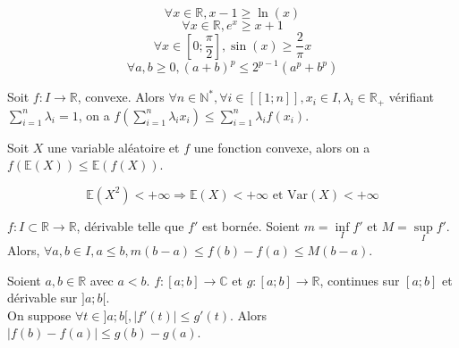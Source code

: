 \documentclass[landscape,twocolumn]{article}
\begin{document}
\begin{exe}
$$\forall x \in \mathbb{R}, x-1 \geqslant \ln(x)$$
$$\forall x \in \mathbb{R}, e^x \geqslant x+1$$
$$\forall x \in [0;\dfrac{\pi}{2}], \sin(x) \geqslant \dfrac{2}{\pi}x$$
$$ \forall a,b \geq 0 , (a+b)^p \leq 2^{p-1} (a^p+b^p)$$

\end{exe}

\begin{ine}
\begin{center}
Soit $f : I \longrightarrow \mathbb{R}$, convexe. Alors $\forall n \in \mathbb{N}^*,\forall i \in [\![1;n]\!], x_i \in I, \lambda_i \in \mathbb{R}_+$ vérifiant $\sum \limits_{i=1}^n \lambda_i =1$, 
 on a $f(\sum \limits_{i=1}^n \lambda_i x_i) \leqslant \sum \limits_{i=1}^n \lambda_i f(x_i)$.
\end{center}
\end{ine}

\begin{exe}
\begin{center}
Soit $X$ une variable aléatoire et $f$ une fonction convexe, alors on a 
$ f(\mathbb{E}(X))  \leq \mathbb{E}(f(X))$.
\end{center}
\end{exe}

\begin{exe}
$$\mathbb{E}(X^2) < +\infty \Longrightarrow \mathbb{E}(X)  < +\infty \text{ et } \text{Var}(X)  < +\infty$$
\end{exe}

\begin{ine}
\begin{center}
$f : I \subset \mathbb{R} \longrightarrow \mathbb{R}$, dérivable telle que $f'$ est bornée. Soient $m = \inf \limits_I f'$ et $M = \sup \limits_I f'$. Alors, $\forall a,b \in I, a \leqslant b, m(b-a) \leqslant f(b)-f(a) \leqslant M(b-a)$.
\end{center}
\end{ine}

\begin{ine}
\begin{center}
Soient $a,b \in \mathbb{R}$ avec $a<b$. $f : [a;b] \longrightarrow \mathbb{C}$ et $g : [a;b] \longrightarrow \mathbb{R}$, continues sur $[a;b]$ et dérivable sur $]a;b[$. \\
On suppose $\forall t \in ]a;b[, |f'(t)| \leqslant g'(t)$. Alors $|f(b)-f(a)| \leqslant g(b)-g(a)$.
\end{center}
\end{ine}
\end{document}
